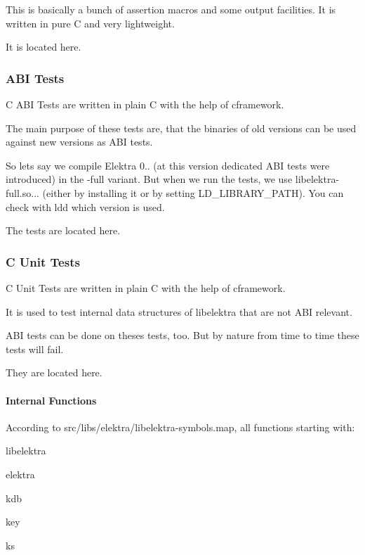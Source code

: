 This is basically a bunch of assertion macros and some output facilities. It is written in pure C and very lightweight.

It is located here.

\subsubsection*{A\+B\+I Tests}

C A\+B\+I Tests are written in plain C with the help of cframework.

The main purpose of these tests are, that the binaries of old versions can be used against new versions as A\+B\+I tests.

So lets say we compile Elektra 0.. (at this version dedicated A\+B\+I tests were introduced) in the {\ttfamily -\/full} variant. But when we run the tests, we use {\ttfamily libelektra-\/full.\+so...} (either by installing it or by setting {\ttfamily L\+D\+\_\+\+L\+I\+B\+R\+A\+R\+Y\+\_\+\+P\+A\+T\+H}). You can check with ldd which version is used.

The tests are located here.

\subsubsection*{C Unit Tests}

C Unit Tests are written in plain C with the help of cframework.

It is used to test internal data structures of libelektra that are not A\+B\+I relevant.

A\+B\+I tests can be done on theses tests, too. But by nature from time to time these tests will fail.

They are located here.

\paragraph*{Internal Functions}

According to {\ttfamily src/libs/elektra/libelektra-\/symbols.\+map}, all functions starting with\+:


\begin{DoxyItemize}
\item libelektra
\item elektra
\item kdb
\item key
\item ks
\end{DoxyItemize}

